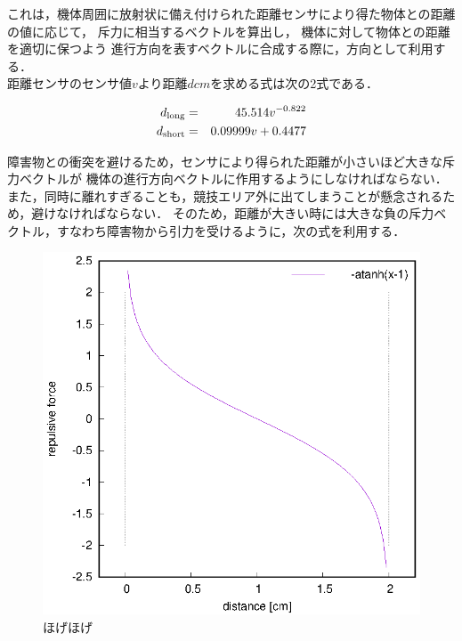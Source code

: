 \documentclass[11pt,a4paper]{jsarticle}
\begin{document}
  これは，機体周囲に放射状に備え付けられた距離センサにより得た物体との距離の値に応じて，
  斥力に相当するベクトルを算出し，
  機体に対して物体との距離を適切に保つよう
  進行方向を表すベクトルに合成する際に，方向として利用する．\\

  距離センサのセンサ値$v$より距離$d \unit{cm}$を求める式は次の2式である．

  \begin{eqnarray}
    d_{\rm{ long}} &=& 45.514 v^{-0.822} \\
    d_{\rm{short}} &=& 0.09999 v + 0.4477
  \end{eqnarray}

  障害物との衝突を避けるため，センサにより得られた距離が小さいほど大きな斥力ベクトルが
  機体の進行方向ベクトルに作用するようにしなければならない．
  また，同時に離れすぎることも，競技エリア外に出てしまうことが懸念されるため，避けなければならない．
  そのため，距離が大きい時には大きな負の斥力ベクトル，すなわち障害物から引力を受けるように，次の式を利用する．

  \begin{figure}[b]
    \begin{center}
      \includegraphics[width=1.0\hsize]{plot/minus_atanh.eps}
    \end{center}
    \caption{ほげほげ}
    \label{fig::atanh}
  \end{figure}
\end{document}
